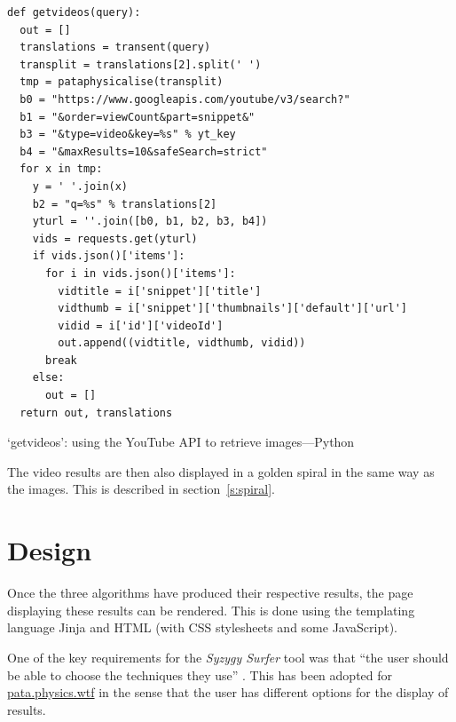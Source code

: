 \begin{listing}
  \begin{verbatim}
def getvideos(query):
  out = []
  translations = transent(query)
  transplit = translations[2].split(' ')
  tmp = pataphysicalise(transplit)
  b0 = "https://www.googleapis.com/youtube/v3/search?"
  b1 = "&order=viewCount&part=snippet&"
  b3 = "&type=video&key=%s" % yt_key
  b4 = "&maxResults=10&safeSearch=strict"
  for x in tmp:
    y = ' '.join(x)
    b2 = "q=%s" % translations[2]
    yturl = ''.join([b0, b1, b2, b3, b4])
    vids = requests.get(yturl)
    if vids.json()['items']:
      for i in vids.json()['items']:
        vidtitle = i['snippet']['title']
        vidthumb = i['snippet']['thumbnails']['default']['url']
        vidid = i['id']['videoId']
        out.append((vidtitle, vidthumb, vidid))
      break
    else:
      out = []
  return out, translations
  \end{verbatim}
\caption[`getvideos' function---Python]{`getvideos': using the YouTube API to retrieve images---Python}
\label{code:videosearch}
\end{listing}

The video results are then also displayed in a golden spiral in the same way as the images. This is described in section~\ref{s:spiral}.


\section{Design}

Once the three algorithms have produced their respective results, the page displaying these results can be rendered. This is done using the templating language Jinja \autocite{Jinja2016} and \ac{HTML} (with \ac{CSS} stylesheets and some JavaScript).

One of the key requirements for the \textit{Syzygy Surfer} tool was that ``the user should be able to choose the techniques they use'' \autocite{Hendler2011}. This has been adopted for \url{pata.physics.wtf} in the sense that the user has different options for the display of results.

